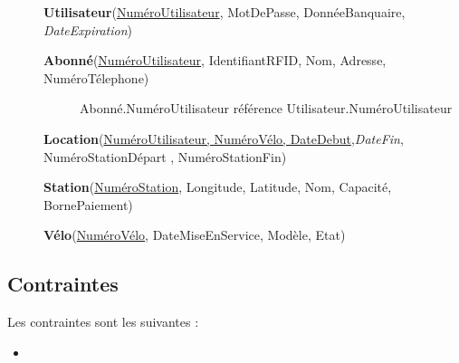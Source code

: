 \documentclass[a4paper,10pt]{article}
\begin{document}
\begin{description}
\item[] \textbf{Utilisateur}(\underline{NuméroUtilisateur}, MotDePasse, DonnéeBanquaire, \textit{DateExpiration})

\item[] \textbf{Abonné}(\underline{NuméroUtilisateur}, IdentifiantRFID, Nom, Adresse, NuméroTélephone)
	\begin{description}
	\item[] Abonné.NuméroUtilisateur référence Utilisateur.NuméroUtilisateur
	\end{description}

\item[] \textbf{Location}(\underline{NuméroUtilisateur, NuméroVélo, DateDebut},\textit{DateFin}, NuméroStationDépart , NuméroStationFin) %
	
\item[] \textbf{Station}(\underline{NuméroStation}, Longitude, Latitude, Nom, Capacité, BornePaiement)

 \item[] \textbf{Vélo}(\underline{NuméroVélo}, DateMiseEnService, Modèle, Etat)

\end{description}

\subsection{Contraintes}

Les contraintes sont les suivantes :
\begin{itemize}
  \item 
\end{itemize}
\end{document}
